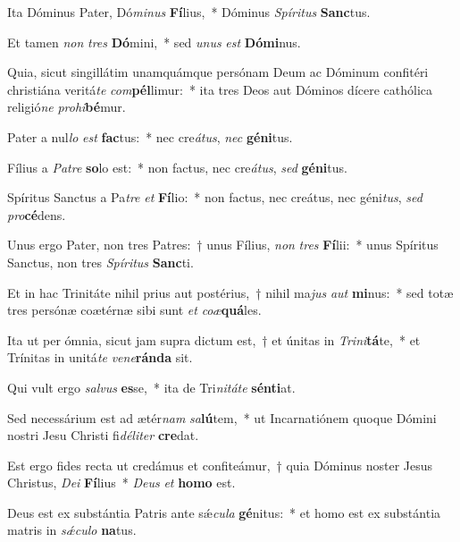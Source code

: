 \item Ita Dóminus Pater, Dó\textit{mi}\textit{nus} \textbf{Fí}lius,~* Dóminus \textit{Spí}\textit{ri}\textit{tus} \textbf{Sanc}tus.
\item Et tamen \textit{non} \textit{tres} \textbf{Dó}mini,~* sed \textit{u}\textit{nus} \textit{est} \textbf{Dó}\textbf{mi}nus.
\item Quia, sicut singillátim unamquámque persónam Deum ac Dóminum confitéri christiána veritá\textit{te} \textit{com}\textbf{pél}limur:~* ita tres Deos aut Dóminos dícere cathólica religió\textit{ne} \textit{pro}\textit{hi}\textbf{bé}mur.
\item Pater a nul\textit{lo} \textit{est} \textbf{fac}tus:~* nec cre\textit{á}\textit{tus}, \textit{nec} \textbf{gé}\textbf{ni}tus.
\item Fílius a \textit{Pa}\textit{tre} \textbf{so}lo est:~* non factus, nec cre\textit{á}\textit{tus}, \textit{sed} \textbf{gé}\textbf{ni}tus.
\item Spíritus Sanctus a Pa\textit{tre} \textit{et} \textbf{Fí}lio:~* non factus, nec creátus, nec géni\textit{tus}, \textit{sed} \textit{pro}\textbf{cé}dens.
\item Unus ergo Pater, non tres Patres:~† unus Fílius, \textit{non} \textit{tres} \textbf{Fí}lii:~* unus Spíritus Sanctus, non tres \textit{Spí}\textit{ri}\textit{tus} \textbf{Sanc}ti.
\item Et in hac Trinitáte nihil prius aut postérius,~† nihil ma\textit{jus} \textit{aut} \textbf{mi}nus:~* sed totæ tres persónæ coætérnæ sibi sunt \textit{et} \textit{co}\textit{æ}\textbf{quá}les.
\item Ita ut per ómnia, sicut jam supra dictum est,~† et únitas in \textit{Tri}\textit{ni}\textbf{tá}te,~* et Trínitas in unitá\textit{te} \textit{ve}\textit{ne}\textbf{rán}\textbf{da} sit.
\item Qui vult ergo \textit{sal}\textit{vus} \textbf{es}se,~* ita de Tri\textit{ni}\textit{tá}\textit{te} \textbf{sén}\textbf{ti}at.
\item Sed necessárium est ad ætér\textit{nam} \textit{sa}\textbf{lú}tem,~* ut Incarnatiónem quoque Dómini nostri Jesu Christi fi\textit{dé}\textit{li}\textit{ter} \textbf{cre}dat.
\item Est ergo fides recta ut credámus et confiteámur,~† quia Dóminus noster Jesus Christus, \textit{De}\textit{i} \textbf{Fí}lius~* \textit{De}\textit{us} \textit{et} \textbf{ho}\textbf{mo} est.
\item Deus est ex substántia Patris ante sǽ\textit{cu}\textit{la} \textbf{gé}nitus:~* et homo est ex substántia matris in \textit{sǽ}\textit{cu}\textit{lo} \textbf{na}tus.

